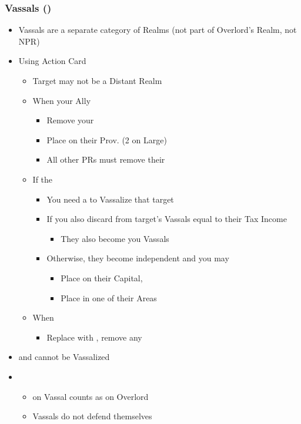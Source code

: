 \documentclass[10pt]{article}
\begin{document}
\subsubsection*{Vassals (\vassal) }
\begin{itemize}
	\item Vassals are a separate category of Realms (not part of Overlord's Realm, not NPR)
	\item Using  Action Card
	\begin{itemize}
		\item Target may not be a Distant Realm
		\item When  your Ally
		\begin{itemize}
			\item Remove your \alliance
			\item Place \vassals on their Prov. (2 on Large)
			\item All other PRs must remove their \marriages
		\end{itemize}
		\item If the 
		\begin{itemize}
			\item You need a \marriage to Vassalize that target
			\item If you also discard \influence from target's Vassals equal to their Tax Income
			\begin{itemize}
				\item They also become you Vassals
			\end{itemize}
			\item Otherwise, they become independent and you may
			\begin{itemize}
				\item Place \alliance on their Capital, 
				\item Place \claim in one of their Areas
			\end{itemize}
		\end{itemize}
		\item When 
		\begin{itemize}
			\item Replace \vassals with \towns, remove any \marriage
		\end{itemize}
	\end{itemize}
	\item {} and  cannot be Vassalized
	\item {}
	\begin{itemize}
		\item \claim on Vassal counts as \claim on Overlord
		\item Vassals do not defend themselves
	\end{itemize}
\end{itemize}
\end{document}
